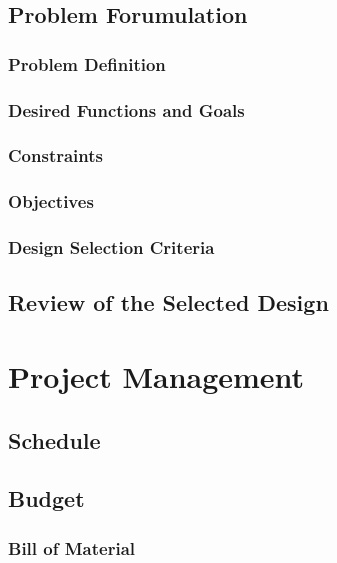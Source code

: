 \documentclass[ece]{uw-wkrpt}
\let\oldsection\section
\renewcommand\section{\clearpage\oldsection}
\begin{document}
\subsection{Problem Forumulation}

\subsubsection{Problem Definition}

\subsubsection{Desired Functions and Goals}

% 
\subsubsection{Constraints}

\subsubsection{Objectives}

% 
\subsubsection{Design Selection Criteria}

% 
\subsection{Review of the Selected Design}

\section{Project Management}

% 
\subsection{Schedule}

% 
\subsection{Budget}

\subsubsection{Bill of Material}
\end{document}
